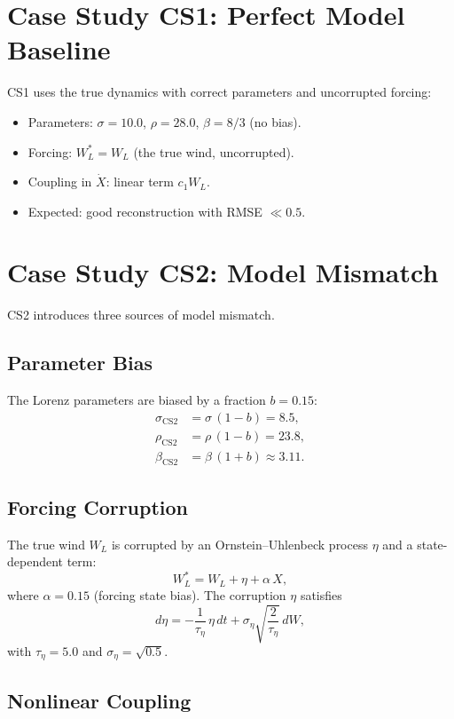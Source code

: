 \documentclass[11pt,a4paper]{article}
\begin{document}
\section{Case Study CS1: Perfect Model Baseline}

CS1 uses the true dynamics with correct parameters and uncorrupted forcing:
\begin{itemize}[noitemsep]
\item Parameters: $\sigma = 10.0$, $\rho = 28.0$, $\beta = 8/3$ (no bias).
\item Forcing: $W_L^* = W_L$ (the true wind, uncorrupted).
\item Coupling in $\dot X$: linear term $c_1 W_L$.
\item Expected: good reconstruction with RMSE $\ll 0.5$.
\end{itemize}

\section{Case Study CS2: Model Mismatch}

CS2 introduces three sources of model mismatch.

\subsection{Parameter Bias}

The Lorenz parameters are biased by a fraction $b = 0.15$:
\begin{align}
\sigma_{\text{CS2}} &= \sigma\,(1 - b) = 8.5,\\
\rho_{\text{CS2}}  &= \rho\,(1 - b) = 23.8,\\
\beta_{\text{CS2}} &= \beta\,(1 + b) \approx 3.11.
\end{align}

\subsection{Forcing Corruption}

The true wind $W_L$ is corrupted by an Ornstein--Uhlenbeck process $\eta$ and a state-dependent term:
\[
W_L^* = W_L + \eta + \alpha\,X,
\]
where $\alpha = 0.15$ (forcing state bias). The corruption $\eta$ satisfies
\[
d\eta = -\frac{1}{\tau_\eta}\,\eta\,dt + \sigma_\eta\sqrt{\frac{2}{\tau_\eta}}\,dW,
\]
with $\tau_\eta = 5.0$ and $\sigma_\eta = \sqrt{0.5}$.

\subsection{Nonlinear Coupling}
\end{document}
